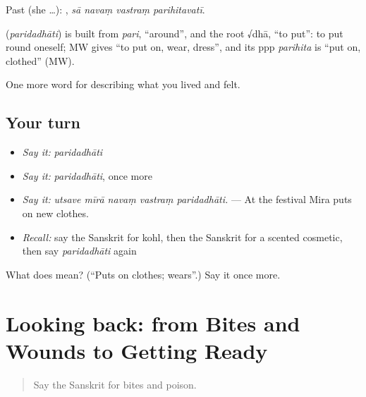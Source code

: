 Past (she …):    , \emph{sā navaṃ vastraṃ parihitavatī}.

\begin{cousinweb}
\textbf{} (\emph{paridadhāti}) is built from \emph{pari}, \textquotedblleft{}around\textquotedblright{}, and the root √dhā, \textquotedblleft{}to put\textquotedblright{}: to put round oneself; MW gives \textquotedblleft{}to put on, wear, dress\textquotedblright{}, and its ppp \emph{parihita} is \textquotedblleft{}put on, clothed\textquotedblright{} (MW).
\end{cousinweb}

\begin{grammarlens}[title={What you've built}]
One more word for describing what you lived and felt.
\end{grammarlens}

\subsection*{Your turn}
\begin{itemize}
\raggedright
  \item \emph{Say it:} \emph{paridadhāti}
  \item \emph{Say it:} \emph{paridadhāti}, once more
  \item \emph{Say it:} \emph{utsave mīrā navaṃ vastraṃ paridadhāti.} — At the festival Mira puts on new clothes.
  \item \emph{Recall:} say the Sanskrit for kohl, then the Sanskrit for a scented cosmetic, then say \emph{paridadhāti} again
\end{itemize}

\begin{tcolorbox}[breakable,colback=teal!4,colframe=teal!35!black,title={Before you move on}]
What does  mean? (\textquotedblleft{}Puts on clothes; wears\textquotedblright{}.) Say it once more.
\end{tcolorbox}
\section[(dialogue)]{Looking back: from Bites and Wounds to Getting Ready}

\label{lesson:SA-R487-review-480-487}



\begin{quote}
Say the Sanskrit for bites and poison.
\end{quote}

